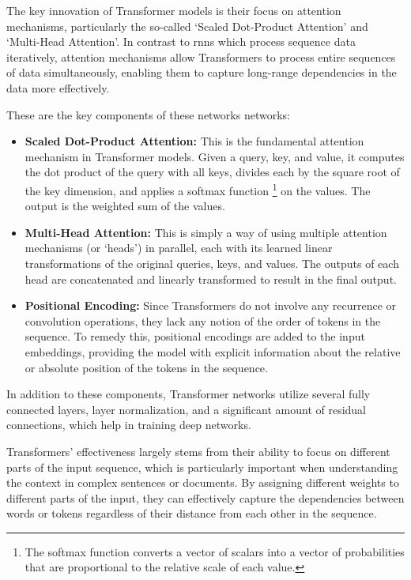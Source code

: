 The key innovation of Transformer models is their focus on attention
mechanisms, particularly the so-called `Scaled Dot-Product Attention' and
`Multi-Head Attention'. In contrast to \glspl{rnn} which process sequence data
iteratively, attention mechanisms allow Transformers to process entire
sequences of data simultaneously, enabling them to capture long-range
dependencies in the data more effectively.

These are the key components of these networks networks:

\begin{itemize}
    \item \textbf{Scaled Dot-Product Attention:} This is the fundamental attention
          mechanism in Transformer models. Given a query, key, and value, it computes
          the dot product of the query with all keys, divides each by the square root
          of the key dimension, and applies a softmax function
          \footnote{The softmax function converts a vector of scalars into a
              vector of probabilities that are proportional to the relative scale
              of each value.} on the values.
          The output is the weighted sum of the values.

    \item \textbf{Multi-Head Attention:} This is simply a way of using multiple
          attention mechanisms (or `heads') in parallel, each with its learned linear
          transformations of the original queries, keys, and values. The outputs of
          each head are concatenated and linearly transformed to result in the final output.

    \item \textbf{Positional Encoding:} Since Transformers do not involve any
          recurrence or convolution operations, they lack any notion of the order of
          tokens in the sequence. To remedy this, positional encodings are added to
          the input embeddings, providing the model with explicit information about
          the relative or absolute position of the tokens in the sequence.
\end{itemize}

In addition to these components, Transformer networks utilize several fully
connected layers, layer normalization, and a significant amount of residual
connections, which help in training deep networks.

Transformers' effectiveness largely stems from their ability to focus on
different parts of the input sequence, which is particularly important when
understanding the context in complex sentences or documents. By assigning
different weights to different parts of the input, they can effectively capture
the dependencies between words or tokens regardless of their distance from each
other in the sequence.


